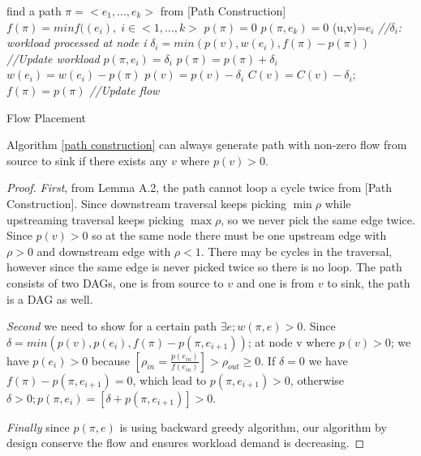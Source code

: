 \begin{algorithm} \label{flow placement}
\SetAlgoLined
\BlankLine
{}
{
find a path $\pi = <e_1, \dots, e_k> $ from [Path Construction]\;
$f(\pi) = min{f((e_i)},\; i\in <1,\dots,k>$\;
	$p(\pi)=0$\;
	$p(\pi, e_k)=0$\;
	\BlankLine
	{
	(u,v)=$e_i$\;
	\emph{//$\delta_i$: workload processed at node i}\;
	$\delta_i = min( p(v), w(e_{i}) , f(\pi) -p(\pi))$\;
	\emph{//Update workload}\;
	$p(\pi, e_i) =\delta_i$\;
	$ p(\pi)= p(\pi)+ \delta_i$\;
	$w(e_i) = w(e_i)- p(\pi)$\;
	$p(v) = p(v)-\delta_i$\;
	$C(v) = C(v) - \delta_i$;
	}
	\BlankLine
	$f(\pi) = p(\pi) $
	\BlankLine
	\emph{//Update flow}\;
	
}
\caption{Flow Placement}
\end{algorithm}
\begin{lemma}   Algorithm \ref{path construction} can always generate path with non-zero flow from source to sink if there exists any $v$ where $p(v) >0$. \end{lemma}
\begin{proof}
\textit{First}, from Lemma A.2, the path cannot loop a cycle twice from [Path Construction]. Since downstream traversal keeps picking $\min \rho$ while upstreaming traversal keeps picking $\max \rho$, so we never pick the same edge twice. Since $p(v)>0$ so at the same node there must be one upstream edge with $\rho>0$ and downstream edge with $\rho<1$. There may be cycles in the traversal, however since the same edge is never picked twice so there is no loop. The path consists of two DAGs, one is from source to $v$ and one is from $v$ to sink, the path is a DAG as well.

\textit{Second} we need to show for a certain path $\exists e; w(\pi, e)>0$. Since $\delta = min( p(v),p(e_{i}),f(\pi) -p(\pi,e_{i+1}))$; at node v where $p(v)>0$; we have $p(e_i)>0$ because $[\rho_{in} =\frac{p(e_{in})}{f(e_{in})} ]>\rho_{out}\geq 0$. If $\delta=0$ we have $ f(\pi) -p(\pi,e_{i+1}) =0$, which lead to $ p(\pi, e_{i+1})>0$, otherwise $ \delta>0; p(\pi, e_i) = [ \delta+p(\pi, e_{i+1} )]>0$.

\textit{Finally} since $p(\pi, e)$ is using backward greedy algorithm, our algorithm by design conserve the flow and ensures workload demand is decreasing.
\end{proof}

